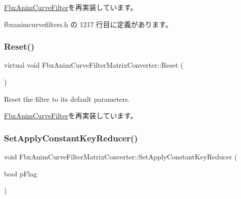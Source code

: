\hyperlink{class_fbx_anim_curve_filter_af768a9c47e4f5a5fff47a8ec781e6b4c}{Fbx\+Anim\+Curve\+Filter}を再実装しています。



 fbxanimcurvefilters.\+h の 1217 行目に定義があります。

\mbox{\label{class_fbx_anim_curve_filter_matrix_converter_ad441f2753722fa3fd07631fb249afadb}} 
\subsubsection{\texorpdfstring{Reset()}{Reset()}}
{\footnotesize\ttfamily virtual void Fbx\+Anim\+Curve\+Filter\+Matrix\+Converter\+::\+Reset (\begin{DoxyParamCaption}{ }\end{DoxyParamCaption})\hspace{0.3cm}{\ttfamily [virtual]}}

Reset the filter to its default parameters. 

\hyperlink{class_fbx_anim_curve_filter_a57fb35baaaa85adb08946383cf40e811}{Fbx\+Anim\+Curve\+Filter}を再実装しています。

\mbox{\label{class_fbx_anim_curve_filter_matrix_converter_a67f6df28fee3f4703d96a2f92d58dfe2}} 
\subsubsection{\texorpdfstring{Set\+Apply\+Constant\+Key\+Reducer()}{SetApplyConstantKeyReducer()}}
{\footnotesize\ttfamily void Fbx\+Anim\+Curve\+Filter\+Matrix\+Converter\+::\+Set\+Apply\+Constant\+Key\+Reducer (\begin{DoxyParamCaption}\item[{bool}]{p\+Flag }\end{DoxyParamCaption})}

